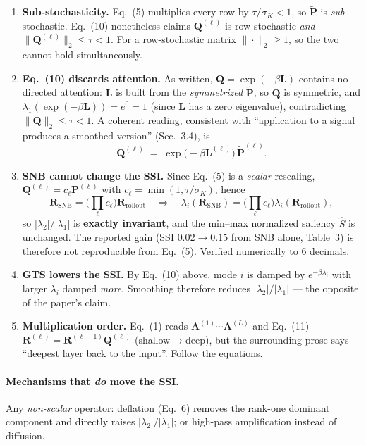 \documentclass[11pt]{article}
\newcommand{\A}{\mathbf{A}}
\newcommand{\Lap}{\mathbf{L}}
\newcommand{\Pm}{\mathbf{P}}
\newcommand{\Pt}{\tilde{\mathbf{P}}}
\newcommand{\Q}{\mathbf{Q}}
\newcommand{\R}{\mathbf{R}}
\begin{document}
\begin{enumerate}
\item \textbf{Sub-stochasticity.} Eq.~(5) multiplies every row by $\tau/\sigma_K<1$, so
$\Pt$ is \emph{sub}-stochastic. Eq.~(10) nonetheless claims $\Q^{(\ell)}$ is
row-stochastic \emph{and} $\|\Q^{(\ell)}\|_2\le\tau<1$. For a row-stochastic matrix
$\|\cdot\|_2\ge 1$, so the two cannot hold simultaneously.

\item \textbf{Eq.~(10) discards attention.} As written, $\Q=\exp(-\beta\Lap)$ contains
no directed attention: $\Lap$ is built from the \emph{symmetrized} $\Pt$, so $\Q$ is
symmetric, and $\lambda_1(\exp(-\beta\Lap)) = e^{0} = 1$ (since $\Lap$ has a zero
eigenvalue), contradicting $\|\Q\|_2\le\tau<1$. A coherent reading, consistent with
``application to a signal produces a smoothed version'' (Sec.~3.4), is
\begin{equation}
\Q^{(\ell)} \;=\; \exp\!\big(-\beta\Lap^{(\ell)}\big)\,\Pt^{(\ell)} .
\end{equation}

\item \textbf{SNB cannot change the SSI.} Since Eq.~(5) is a \emph{scalar} rescaling,
$\Q^{(\ell)} = c_\ell\Pm^{(\ell)}$ with $c_\ell=\min(1,\tau/\sigma_K)$, hence
\begin{equation}
\R_{\text{SNB}} = \Big(\textstyle\prod_{\ell} c_\ell\Big)\R_{\text{rollout}}
\quad\Longrightarrow\quad
\lambda_i(\R_{\text{SNB}}) = \Big(\textstyle\prod_\ell c_\ell\Big)\lambda_i(\R_{\text{rollout}}),
\end{equation}
so $|\lambda_2|/|\lambda_1|$ is \textbf{exactly invariant}, and the min--max normalized
saliency $\hat S$ is unchanged. The reported gain (SSI $0.02\!\to\!0.15$ from SNB alone,
Table~3) is therefore not reproducible from Eq.~(5). Verified numerically to 6 decimals.

\item \textbf{GTS lowers the SSI.} By Eq.~(10) above, mode $i$ is damped by
$e^{-\beta\lambda_i}$ with larger $\lambda_i$ damped \emph{more}. Smoothing therefore
reduces $|\lambda_2|/|\lambda_1|$ --- the opposite of the paper's claim.

\item \textbf{Multiplication order.} Eq.~(1) reads $\A^{(1)}\cdots\A^{(L)}$ and Eq.~(11)
$\R^{(\ell)}=\R^{(\ell-1)}\Q^{(\ell)}$ (shallow$\to$deep), but the surrounding prose says
``deepest layer back to the input''. Follow the equations.
\end{enumerate}

\paragraph{Mechanisms that \emph{do} move the SSI.} Any \emph{non-scalar} operator:
deflation (Eq.~6) removes the rank-one dominant component and directly raises
$|\lambda_2|/|\lambda_1|$; or high-pass amplification instead of diffusion.
\end{document}
